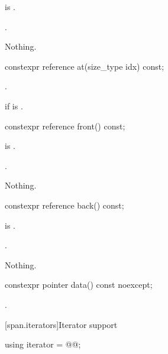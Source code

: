\begin{itemdescr}
\pnum
\hardexpects
{} is .

\pnum
\returns
{}.

\pnum
\throws
Nothing.
\end{itemdescr}

%
\begin{itemdecl}
constexpr reference at(size_type idx) const;
\end{itemdecl}

\begin{itemdescr}
\pnum
\returns
{}.

\pnum
\throws
{} if  is .
\end{itemdescr}

%
\begin{itemdecl}
constexpr reference front() const;
\end{itemdecl}

\begin{itemdescr}
\pnum
\hardexpects
{} is .

\pnum
\returns
{}.

\pnum
\throws
Nothing.
\end{itemdescr}

%
\begin{itemdecl}
constexpr reference back() const;
\end{itemdecl}

\begin{itemdescr}
\pnum
\hardexpects
{} is .

\pnum
\returns
{}.

\pnum
\throws
Nothing.
\end{itemdescr}

%
\begin{itemdecl}
constexpr pointer data() const noexcept;
\end{itemdecl}

\begin{itemdescr}
\pnum
\returns
{}.
\end{itemdescr}

[span.iterators]{Iterator support}

%
\begin{itemdecl}
using iterator = @@;
\end{itemdecl}

